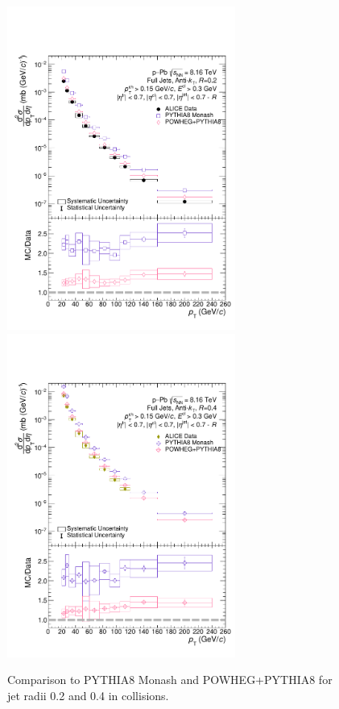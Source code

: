 \begin{figure}
    \centering
    \begin{multicols}{2}
            \includegraphics[width=7.5cm]{figures/pPbFigures/MCGen/MCComp_R02_nooutlier.pdf}
        \vfill\null
        \columnbreak
            \includegraphics[width=7.5cm]{figures/pPbFigures/MCGen/MCComp_R04_nooutlier.pdf}
        \vfill\null
    \end{multicols}
    \caption{Comparison to PYTHIA8 Monash and POWHEG+PYTHIA8 for jet radii 0.2 and 0.4 in \pPb collisions.}
    \label{fig:MCGen_pPb}
\end{figure}

